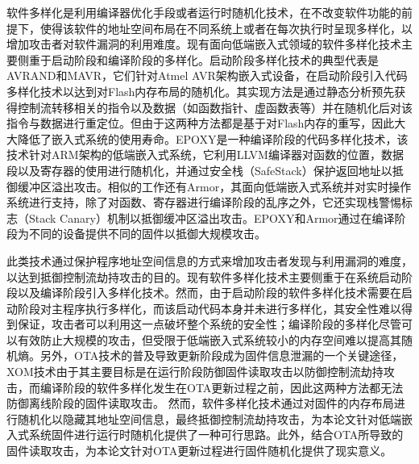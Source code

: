 \documentclass[12pt,a4paper]{ctexart}
\numberwithin{figure}{section}
\begin{document}
\par 软件多样化是利用编译器优化手段或者运行时随机化技术，在不改变软件功能的前提下，使得该软件的地址空间布局在不同系统上或者在每次执行时呈现多样化，以增加攻击者对软件漏洞的利用难度。现有面向低端嵌入式领域的软件多样化技术主要侧重于启动阶段和编译阶段的多样化。启动阶段多样化技术的典型代表是AVRAND\cite{pastrana2016avrand}和MAVR\cite{habibi2015mavr}，它们针对Atmel AVR架构嵌入式设备，在启动阶段引入代码多样化技术以达到对Flash内存布局的随机化。其实现方法是通过静态分析预先获得控制流转移相关的指令以及数据（如函数指针、虚函数表等）并在随机化后对该指令与数据进行重定位。但由于这两种方法都是基于对Flash内存的重写，因此大大降低了嵌入式系统的使用寿命。EPOXY\cite{7958583}是一种编译阶段的代码多样化技术，该技术针对ARM架构的低端嵌入式系统，它利用LLVM编译器对函数的位置，数据段以及寄存器的使用进行随机化，并通过安全栈（SafeStack）\cite{kuznetzov2018code}保护返回地址以抵御缓冲区溢出攻击。相似的工作还有Armor\cite{8806725}，其面向低端嵌入式系统并对实时操作系统进行支持，除了对函数、寄存器进行编译阶段的乱序之外，它还实现栈警惕标志（Stack Canary）机制以抵御缓冲区溢出攻击。EPOXY和Armor通过在编译阶段为不同的设备提供不同的固件以抵御大规模攻击。
\par 此类技术通过保护程序地址空间信息的方式来增加攻击者发现与利用漏洞的难度，以达到抵御控制流劫持攻击的目的。现有软件多样化技术主要侧重于在系统启动阶段以及编译阶段引入多样化技术。然而，由于启动阶段的软件多样化技术需要在启动阶段对主程序执行多样化，而该启动代码本身并未进行多样化，其安全性难以得到保证，攻击者可以利用这一点破坏整个系统的安全性；编译阶段的多样化尽管可以有效防止大规模的攻击，但受限于低端嵌入式系统较小的内存空间难以提高其随机熵。另外，OTA技术的普及导致更新阶段成为固件信息泄漏的一个关键途径，XOM技术由于其主要目标是在运行阶段防御固件读取攻击以防御控制流劫持攻击，而编译阶段的软件多样化发生在OTA更新过程之前，因此这两种方法都无法防御离线阶段的固件读取攻击。
然而，软件多样化技术通过对固件的内存布局进行随机化以隐藏其地址空间信息，最终抵御控制流劫持攻击，为本论文针对低端嵌入式系统固件进行运行时随机化提供了一种可行思路。此外，结合OTA所导致的固件读取攻击，为本论文针对OTA更新过程进行固件随机化提供了现实意义。
\end{document}
